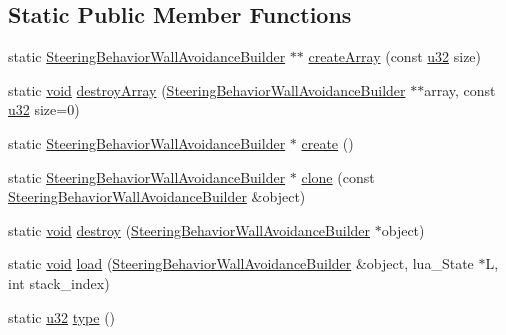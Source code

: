 \subsection*{Static Public Member Functions}
\begin{DoxyCompactItemize}
\item 
static \mbox{\hyperlink{classnjli_1_1_steering_behavior_wall_avoidance_builder}{Steering\+Behavior\+Wall\+Avoidance\+Builder}} $\ast$$\ast$ \mbox{\hyperlink{classnjli_1_1_steering_behavior_wall_avoidance_builder_a8bbb6ee79f62ba5abaadc712668ccccc}{create\+Array}} (const \mbox{\hyperlink{_util_8h_a10e94b422ef0c20dcdec20d31a1f5049}{u32}} size)
\item 
static \mbox{\hyperlink{_thread_8h_af1e856da2e658414cb2456cb6f7ebc66}{void}} \mbox{\hyperlink{classnjli_1_1_steering_behavior_wall_avoidance_builder_a1791f5ae92b1b157383493d65dfef923}{destroy\+Array}} (\mbox{\hyperlink{classnjli_1_1_steering_behavior_wall_avoidance_builder}{Steering\+Behavior\+Wall\+Avoidance\+Builder}} $\ast$$\ast$array, const \mbox{\hyperlink{_util_8h_a10e94b422ef0c20dcdec20d31a1f5049}{u32}} size=0)
\item 
static \mbox{\hyperlink{classnjli_1_1_steering_behavior_wall_avoidance_builder}{Steering\+Behavior\+Wall\+Avoidance\+Builder}} $\ast$ \mbox{\hyperlink{classnjli_1_1_steering_behavior_wall_avoidance_builder_af4e1862c16f0f5fd4023554874861517}{create}} ()
\item 
static \mbox{\hyperlink{classnjli_1_1_steering_behavior_wall_avoidance_builder}{Steering\+Behavior\+Wall\+Avoidance\+Builder}} $\ast$ \mbox{\hyperlink{classnjli_1_1_steering_behavior_wall_avoidance_builder_a94e0a55627424bb4e7aca4868c35ab62}{clone}} (const \mbox{\hyperlink{classnjli_1_1_steering_behavior_wall_avoidance_builder}{Steering\+Behavior\+Wall\+Avoidance\+Builder}} \&object)
\item 
static \mbox{\hyperlink{_thread_8h_af1e856da2e658414cb2456cb6f7ebc66}{void}} \mbox{\hyperlink{classnjli_1_1_steering_behavior_wall_avoidance_builder_a8aec21f1e7af52a4635b0a14a8b93760}{destroy}} (\mbox{\hyperlink{classnjli_1_1_steering_behavior_wall_avoidance_builder}{Steering\+Behavior\+Wall\+Avoidance\+Builder}} $\ast$object)
\item 
static \mbox{\hyperlink{_thread_8h_af1e856da2e658414cb2456cb6f7ebc66}{void}} \mbox{\hyperlink{classnjli_1_1_steering_behavior_wall_avoidance_builder_a3e8c4a7660a4deed1f4f527a6d8b61ea}{load}} (\mbox{\hyperlink{classnjli_1_1_steering_behavior_wall_avoidance_builder}{Steering\+Behavior\+Wall\+Avoidance\+Builder}} \&object, lua\+\_\+\+State $\ast$L, int stack\+\_\+index)
\item 
static \mbox{\hyperlink{_util_8h_a10e94b422ef0c20dcdec20d31a1f5049}{u32}} \mbox{\hyperlink{classnjli_1_1_steering_behavior_wall_avoidance_builder_aaddd874a7c8b297e77bff4ff61a19da3}{type}} ()
\end{DoxyCompactItemize}

